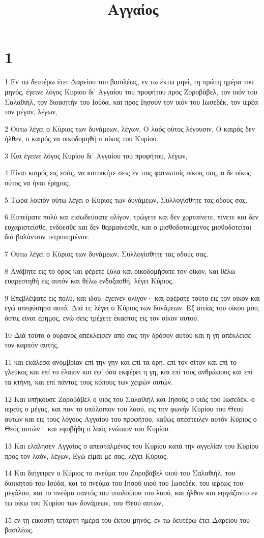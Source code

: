 

\title{Αγγαίος}


\chapter{1}

\par 1 Εν τω δευτέρω έτει Δαρείου του βασιλέως, εν τω έκτω μηνί, τη πρώτη ημέρα του μηνός, έγεινε λόγος Κυρίου δι' Αγγαίου του προφήτου προς Ζοροβάβελ, τον υιόν του Σαλαθιήλ, τον διοικητήν του Ιούδα, και προς Ιησούν τον υιόν του Ιωσεδέκ, τον ιερέα τον μέγαν, λέγων,
\par 2 Ούτω λέγει ο Κύριος των δυνάμεων, λέγων, Ο λαός ούτος λέγουσιν, Ο καιρός δεν ήλθεν, ο καιρός να οικοδομηθή ο οίκος του Κυρίου.
\par 3 Και έγεινε λόγος Κυρίου δι' Αγγαίου του προφήτου, λέγων,
\par 4 Είναι καιρός εις εσάς, να κατοικήτε σεις εν τοις φατνωτοίς οίκοις σας, ο δε οίκος ούτος να ήναι έρημος;
\par 5 Τώρα λοιπόν ούτω λέγει ο Κύριος των δυνάμεων, Συλλογίσθητε τας οδούς σας.
\par 6 Εσπείρατε πολύ και εισωδεύσατε ολίγον, τρώγετε και δεν χορταίνετε, πίνετε και δεν ευχαριστείσθε, ενδύεσθε και δεν θερμαίνεσθε, και ο μισθοδοτούμενος μισθοδοτείται διά βαλάντιον τετρυπημένον.
\par 7 Ούτω λέγει ο Κύριος των δυνάμεων, Συλλογίσθητε τας οδούς σας.
\par 8 Ανάβητε εις το όρος και φέρετε ξύλα και οικοδομήσατε τον οίκον, και θέλω ευαρεστηθή εις αυτόν και θέλω ενδοξασθή, λέγει Κύριος.
\par 9 Επεβλέψατε εις πολύ, και ιδού, έγεινεν ολίγον· και εφέρατε τούτο εις τον οίκον και εγώ απεφύσησα αυτό. Διά τι; λέγει ο Κύριος των δυνάμεων. Εξ αιτίας του οίκου μου, όστις είναι έρημος, ενώ σεις τρέχετε έκαστος εις τον οίκον αυτού.
\par 10 Διά τούτο ο ουρανός απέκλεισεν από σας την δρόσον αυτού και η γη απέκλεισε τον καρπόν αυτής,
\par 11 και εκάλεσα ανομβρίαν επί την γην και επί τα όρη, επί τον σίτον και επί το γλεύκος και επί το έλαιον και εφ' όσα εκφέρει η γη, και επί τους ανθρώπους και επί τα κτήνη, και επί πάντας τους κόπους των χειρών αυτών.
\par 12 Και υπήκουσε Ζοροβάβελ ο υιός του Σαλαθιήλ και Ιησούς ο υιός του Ιωσεδέκ, ο ιερεύς ο μέγας, και παν το υπόλοιπον του λαού, εις την φωνήν Κυρίου του Θεού αυτών και εις τους λόγους Αγγαίου του προφήτου, καθώς απέστειλεν αυτόν Κύριος ο Θεός αυτών· και εφοβήθη ο λαός ενώπιον του Κυρίου.
\par 13 Και ελάλησεν Αγγαίος ο απεσταλμένος του Κυρίου κατά την αγγελίαν του Κυρίου προς τον λαόν, λέγων, Εγώ είμαι με σας, λέγει Κύριος.
\par 14 Και διήγειρεν ο Κύριος το πνεύμα του Ζοροβάβελ υιού του Σαλαθιήλ, του διοικητού του Ιούδα, και το πνεύμα του Ιησού υιού του Ιωσεδέκ, του ιερέως του μεγάλου, και το πνεύμα παντός του υπολοίπου του λαού, και ήλθον και ειργάζοντο εν τω οίκω του Κυρίου των δυνάμεων, του Θεού αυτών,
\par 15 εν τη εικοστή τετάρτη ημέρα του έκτου μηνός, εν τω δευτέρω έτει Δαρείου του βασιλέως.

